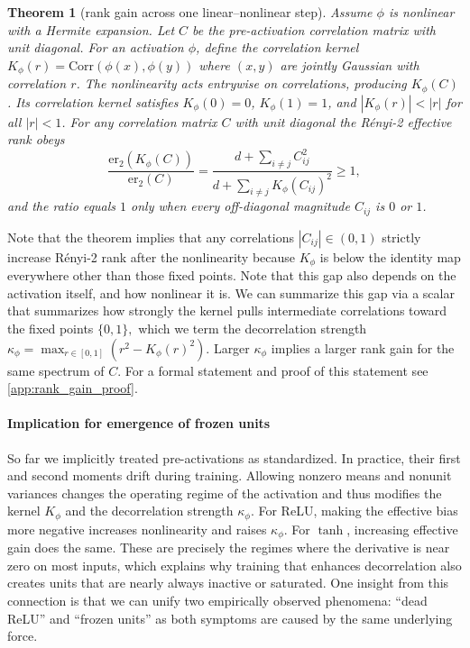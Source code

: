 \documentclass{article}
\newtheorem{theorem}{Theorem}[section]
\numberwithin{figure}{section}
\begin{document}
\begin{theorem}[rank gain across one linear–nonlinear step]
Assume $\phi$ is nonlinear with a Hermite expansion. Let $C$ be the pre-activation correlation matrix with unit diagonal. For an activation $\phi$, define the correlation kernel $K_\phi(r)=\mathrm{Corr}(\phi(x),\phi(y))$ where $(x,y)$ are jointly Gaussian with correlation $r$. The nonlinearity acts entrywise on correlations, producing $K_\phi(C)$. Its correlation kernel satisfies $K_\phi(0)=0$, $K_\phi(1)=1$, and $|K_\phi(r)|<|r|$ for all $|r|<1$. For any correlation matrix $C$ with unit diagonal the Rényi-2 effective rank obeys
\[
\frac{\mathrm{er}_2(K_\phi(C))}{\mathrm{er}_2(C)}
=\frac{d+\sum_{i\ne j}C_{ij}^2}{d+\sum_{i\ne j}K_\phi(C_{ij})^2}\ge 1,
\]
and the ratio equals $1$ only when every off-diagonal magnitude $C_{ij}$ is $0$ or $1$.
\end{theorem}

Note that the theorem implies that any correlations $|C_{ij}|\in(0,1)$ strictly increase Rényi-2 rank after the nonlinearity because $K_\phi$ is below the identity map everywhere other than those fixed points. Note that this gap also depends on the activation itself, and how nonlinear it is. We can summarize this gap via a scalar that summarizes how strongly the kernel pulls intermediate correlations toward the fixed points $\{0,1\},$ which we term the decorrelation strength $\kappa_\phi=\max_{r\in[0,1]}(r^2-K_\phi(r)^2)$. Larger $\kappa_\phi$ implies a larger rank gain for the same spectrum of $C$. For a formal statement and proof of this statement see \cref{app:rank_gain_proof}.

\vspace{-7pt}
\paragraph{Implication for emergence of frozen units}
So far we implicitly treated pre-activations as standardized. In practice, their first and second moments drift during training. Allowing nonzero means and nonunit variances changes the operating regime of the activation and thus modifies the kernel $K_\phi$ and the decorrelation strength $\kappa_\phi$. For ReLU, making the effective bias more negative increases nonlinearity and raises $\kappa_\phi$. For $\tanh$, increasing effective gain does the same. These are precisely the regimes where the derivative is near zero on most inputs, which explains why training that enhances decorrelation also creates units that are nearly always inactive or saturated. One insight from this connection is that we can unify two empirically observed phenomena: ``dead ReLU'' and ``frozen units'' as both symptoms are caused by the same underlying force. 
\end{document}
